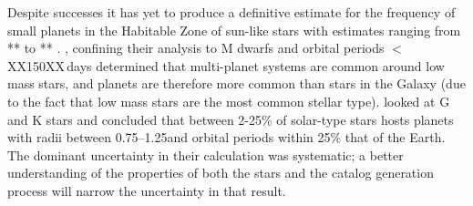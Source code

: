 Despite \keplers{} successes it has yet to produce a definitive estimate for the frequency of small planets in the Habitable Zone of sun-like stars with estimates ranging from ** \citet{FormanMackey??} to ** \citet{highendOccurenceRateRef}. \citet{Dressing2013,Dressing2015}, confining their analysis to M dwarfs and orbital periods $<$ XX150XX\,days  determined that multi-planet systems are common around low mass stars, and planets are therefore more common than stars in the Galaxy (due to the fact that low mass stars are the most common stellar type). \citet{Burke15} looked at G and K stars and concluded that between 2-25\% of solar-type stars hosts planets with radii between 0.75--1.25\Rearth and orbital periods within 25\% that of the Earth. The dominant uncertainty in their calculation was systematic; a better understanding of the properties of both the stars and the catalog generation process will narrow the uncertainty in that result. 





